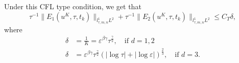 \documentclass[10pt,a4paper]{article}
\begin{document}
  Under this CFL type condition, we get that 
  \begin{equation}\label{F1F2linftyL2}
    \tau^{-1}\|E_1(u^K,\tau,t_k)\|_{l^1_{\tau,m,n} L^2} + 
    \tau^{-1}\|E_2(u^K,\tau,t_k)\|_{l^1_{\tau,m,n} L^2} \leq C_T \delta,
  \end{equation}
  where
  \begin{equation}\label{delta}
    \begin{aligned}
      \delta &= \frac1K = \varepsilon^{\beta\gamma} \tau^{\frac\gamma2}, \quad \text{if } d=1,2\\ 
      \delta &= \varepsilon^{\beta\gamma} \tau^{\frac\gamma2}(|\log\tau|+|\log\varepsilon|)^\frac23,
      \quad \text{if } d=3 .
    \end{aligned}
  \end{equation}
\end{document}
